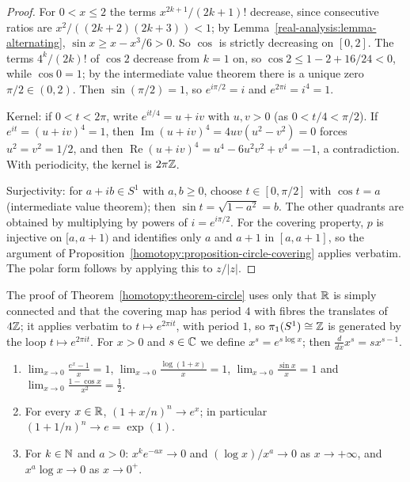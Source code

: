 \begin{proof}
For $0 < x \leq 2$ the terms $x^{2k+1}/(2k+1)!$ decrease, since consecutive ratios are $x^2/((2k+2)(2k+3)) < 1$; by Lemma~\ref{real-analysis:lemma-alternating},
$\sin x \geq x - x^3/6 > 0$. So $\cos$ is strictly decreasing on $[0, 2]$. The terms $4^k/(2k)!$ of $\cos 2$ decrease from $k = 1$ on, so $\cos 2 \leq 1 - 2 + 16/24 < 0$, while $\cos 0 = 1$; by
the intermediate value theorem there is a unique zero $\pi/2 \in (0, 2)$. Then $\sin(\pi/2) = 1$, so $e^{i\pi/2} = i$ and $e^{2\pi i} = i^4 = 1$.

Kernel: if $0 < t < 2\pi$, write $e^{it/4} = u + iv$ with $u, v > 0$ (as $0 < t/4 < \pi/2$). If $e^{it} = (u + iv)^4 = 1$, then $\operatorname{Im}(u + iv)^4 = 4uv(u^2 - v^2) = 0$ forces $u^2 = v^2 = 1/2$, and then
$\operatorname{Re}(u + iv)^4 = u^4 - 6u^2v^2 + v^4 = -1$, a contradiction. With periodicity, the kernel is $2\pi\mathbb{Z}$.

Surjectivity: for $a + ib \in S^1$ with $a, b \geq 0$, choose $t \in [0, \pi/2]$ with $\cos t = a$ (intermediate value theorem); then $\sin t = \sqrt{1 - a^2} = b$. The other quadrants are obtained by
multiplying by powers of $i = e^{i\pi/2}$. For the covering property, $p$ is injective on $[a, a + 1)$ and identifies only $a$ and $a + 1$ in $[a, a + 1]$, so the argument of
Proposition~\ref{homotopy:proposition-circle-covering} applies verbatim. The polar form follows by applying this to $z/|z|$.
\end{proof}

\begin{remark}\label{real-analysis:remark-exponential-covering}
The proof of Theorem~\ref{homotopy:theorem-circle} uses only that $\mathbb{R}$ is simply connected and that the covering map has period $4$ with fibres the translates of $4\mathbb{Z}$; it applies verbatim to
$t \mapsto e^{2\pi it}$, with period $1$, so $\pi_1(S^1) \cong \mathbb{Z}$ is generated by the loop $t \mapsto e^{2\pi it}$. For $x > 0$ and $s \in \mathbb{C}$ we define $x^s = e^{s\log x}$; then $\frac{d}{dx}x^s = sx^{s-1}$.
\end{remark}

\begin{proposition}\label{real-analysis:proposition-notable-limits}
\begin{enumerate}
\item $\lim_{x \to 0}\frac{e^x - 1}{x} = 1$, $\lim_{x \to 0}\frac{\log(1 + x)}{x} = 1$, $\lim_{x \to 0}\frac{\sin x}{x} = 1$ and $\lim_{x \to 0}\frac{1 - \cos x}{x^2} = \frac12$.
\item For every $x \in \mathbb{R}$, $(1 + x/n)^n \to e^x$; in particular $(1 + 1/n)^n \to e = \exp(1)$.
\item For $k \in \mathbb{N}$ and $a > 0$: $x^ke^{-ax} \to 0$ and $(\log x)/x^a \to 0$ as $x \to +\infty$, and $x^a\log x \to 0$ as $x \to 0^+$.
\end{enumerate}
\end{proposition}


